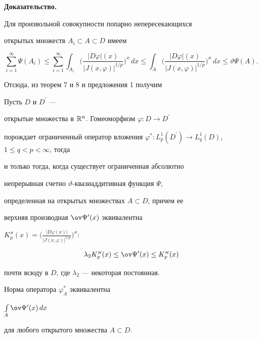 {\bf Доказательство.}






Для произвольной совокупности попарно непересекающихся


открытых множеств $A_i\subset A\subset D$ имеем


$$


\sum_{i=1}^\infty\Psi(A_i)\leq


\sum_{i=1}^\infty\int_{A_i}


\bigg(\frac{|D\varphi|(x)}{|J(x,\varphi)|^{1/p}}\bigg)^\varkappa\,dx\leq


\int_{A}\bigg(\frac{|D\varphi|(x)}{|J(x,\varphi)|^{1/p}}\bigg)^\varkappa\,dx


\leq \vartheta\Psi(A).


$$





Отсюда, из теорем 7 и 8 и предложения 1 получим





\begin{cor}


Пусть $D$ и $D^{\prime}$ ---


открытые множества в ${\Bbb R}^n$. Гомеоморфизм $\varphi :D\to D^{\prime}$


порождает ограниченный оператор вложения $\varphi^{*}


:L_{p}^{1}(D^{\prime})\to L_{q}^{1}(D)$, $1\leq q<p<\infty$, тогда


и только тогда, когда существует ограниченная абсолютно


непрерывная счетно $\vartheta$-квазиаддитивная функция $\Psi$,


определенная на открытых множествах $A\subset D$, причем ее


верхняя производная $\ov\Psi{}^{\prime}(x)$ эквивалентна


$K^\varkappa_p(x)=


\Big(\frac{|D\varphi(x)|}{|J(x,\varphi)|^{1/p}}\Big)^\varkappa{:}$


$$


\lambda_2 K^\varkappa_p(x)\leq \ov\Psi{}^{\prime}(x)\leq


K^\varkappa_p(x)


$$


почти всюду в $D$, где $\lambda_2$ --- некоторая постоянная.





Норма оператора $\varphi^{*}_A$ эквивалентна


$\int\limits_A\ov\Psi{}^{\prime}(x)\,dx$


для любого открытого множества $A\subset D$.


\end{cor}





